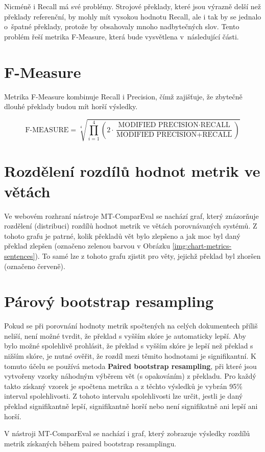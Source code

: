 Nicméně i Recall má své problémy.
Strojové překlady,
  které jsou výrazně delší než překlady referenční,
  by mohly mít vysokou hodnotu Recall,
  ale i tak by se jednalo o~špatné překlady,
  protože by obsahovaly mnoho nadbytečných slov. 
Tento problém řeší metrika F-Measure,
  která bude vysvětlena v~následující části.

\section{F-Measure}
Metrika F-Measure kombinuje Recall i Precision,
  čímž zajišťuje, 
  že zbytečně dlouhé překlady budou mít horší výsledky.

$$ \text{F-MEASURE} = \sqrt[4]{ \prod_{i=1}^{4} \left( 2 \cdot \frac{\text{MODIFIED PRECISION} \cdot \text{RECALL}}{\text{MODIFIED PRECISION} + \text{RECALL}} \right) } $$


\section{Rozdělení rozdílů hodnot metrik ve větách}
Ve webovém rozhraní nástroje \mbox{MT-ComparEval} se nachází graf,
  který znázorňuje rozdělení (distribuci) rozdílů hodnot metrik ve větách porovnávaných systémů.
Z tohoto grafu je patrné, kolik překladů vět bylo zlepšeno a jak moc byl daný překlad zlepšen (označeno zelenou barvou v Obrázku \ref{img:chart-metrics-sentences}).
To samé lze z tohoto grafu zjistit pro věty, jejichž překlad byl zhoršen (označeno červeně).

\section{Párový bootstrap resampling}
Pokud se při porovnání hodnoty metrik spočtených na celých dokumentech příliš neliší,
  není možné tvrdit, že překlad s vyšším skóre je automaticky lepší.
Aby bylo možné spolehlivě prohlásit, že překlad s vyšším skóre je lepší než překlad s nižším skóre,
  je nutné ověřit, že rozdíl mezi těmito hodnotami je signifikantní.
K tomuto účelu se používá metoda \textbf{Paired bootstrap resampling}, %
  při které jsou vytvořeny  vzorky náhodným výběrem vět (s opakováním) z překladu.
Pro každý takto získaný vzorek je spočtena metrika a z těchto výsledků je vybrán 95\% interval spolehlivosti.
Z tohoto intervalu spolehlivosti lze určit, jestli je daný překlad signifikantně lepší, signifikantně horší nebo není signifikatně ani lepší ani horší.

V nástroji \mbox{MT-ComparEval} se nachází i graf, který zobrazuje výsledky rozdílů metrik získaných během paired bootstrap resamplingu.



